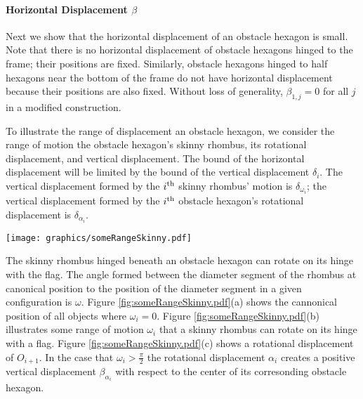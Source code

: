 \paragraph{Horizontal Displacement $\beta$}

Next we show that the horizontal displacement of an obstacle hexagon is small.  
Note that there is no horizontal displacement of obstacle hexagons hinged to the frame; their positions are fixed.  
Similarly, obstacle hexagons hinged to half hexagons near the bottom of the frame do not have horizontal displacement because their positions are also fixed.  
Without loss of generality, $\beta_{1,j}=0$ for all $j$ in a modified construction.

To illustrate the range of displacement an obstacle hexagon, we consider the range of motion the obstacle hexagon's skinny rhombus, its rotational displacement, and vertical displacement.  
The bound of the horizontal displacement will be limited by the bound of the vertical displacement $\delta_i$.  
The vertical displacement formed by the $i^\text{th}$ skinny rhombus' motion is $\delta_{\omega_i}$; the vertical displacement formed by the $i^\text{th}$ obstacle hexagon's rotational displacement is $\delta_{\alpha_i}$.

\begin{minipage}{\linewidth}
\begin{center}
\texttt{[image: graphics/someRangeSkinny.pdf]}
\label{fig:someRangeSkinny.pdf}
\end{center}
\end{minipage}

The skinny rhombus hinged beneath an obstacle hexagon can rotate on its hinge with the flag. 
The angle formed between the diameter segment of the rhombus at canonical position to the position of the diameter segment in a given configuration is $\omega$.
Figure \ref{fig:someRangeSkinny.pdf}(a) shows the cannonical position of all objects where $\omega_i=0$.
Figure \ref{fig:someRangeSkinny.pdf}(b) illustrates some range of motion $\omega_i$ that a skinny rhombus can rotate on its hinge with a flag.  
Figure \ref{fig:someRangeSkinny.pdf}(c) shows a rotational displacement of $O_{i+1}$.  
In the case that $\omega_i > \frac{\pi}{2}$ the rotational displacement $\alpha_i$ creates a positive vertical displacement $\beta_
{\alpha_i}$ with respect to the center of its corresonding obstacle hexagon.

